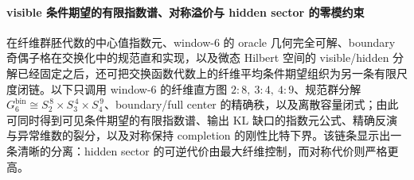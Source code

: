 \paragraph{visible 条件期望的有限指数谱、对称溢价与 hidden sector 的零模约束}
在纤维群胚代数的中心值指数元、window-\(6\) 的 oracle 几何完全可解、boundary 奇偶子格在交换化中的规范直和实现，以及微态 Hilbert 空间的 visible/hidden 分解已经固定之后，还可把交换函数代数上的纤维平均条件期望组织为另一条有限尺度闭链。以下只调用 window-\(6\) 的纤维直方图 \(2:8,\ 3:4,\ 4:9\)、规范群分解 \(G_6^{\mathrm{bin}}\cong S_2^{\,8}\times S_3^{\,4}\times S_4^{\,9}\)、boundary/full center 的精确秩，以及离散容量闭式；由此可同时得到可见条件期望的有限指数谱、输出 KL 缺口的指数元公式、精确反演与异常维数的裂分，以及对称保持 completion 的刚性比特下界。该链条显示出一条清晰的分离：hidden sector 的可逆代价由最大纤维控制，而对称代价则严格更高。

